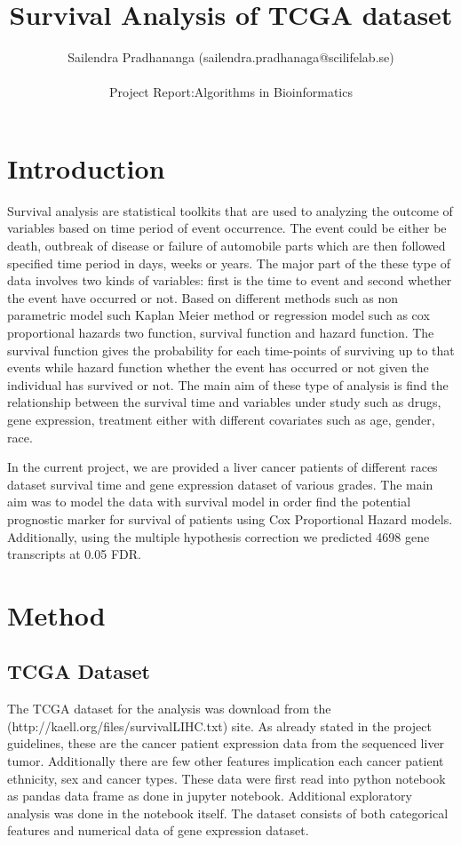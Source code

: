 \documentclass[a4paper,10pt]{article}
\title{Survival Analysis of TCGA dataset}
\author{ Sailendra Pradhananga (sailendra.pradhanaga@scilifelab.se)\\ \\
			Project Report:Algorithms in Bioinformatics}
\begin{document}
\maketitle

\section{Introduction}


Survival analysis are statistical toolkits that are used to analyzing the outcome of variables based on time period of event occurrence. The event could be either be death, outbreak of disease or failure of automobile parts which are then followed specified time period in days, weeks or years. The major part of the these type of data involves two kinds of variables: first is the time to event and second whether the event have occurred or not. Based on different methods such as non parametric model such Kaplan Meier method or regression model such as cox proportional hazards two function, survival function and hazard function. The survival function gives the probability  for each time-points of surviving up to that events while hazard function whether the event has occurred or not  given the individual has survived or not. The main aim of these type of analysis is find the relationship between the survival time and variables under study such as drugs, gene expression, treatment  either with different covariates such as age, gender, race.

In the current project, we are provided a liver cancer patients of different races  dataset survival time and gene expression dataset of various grades. The main aim was to model the data with survival model in order find the potential prognostic marker for survival of patients using Cox Proportional Hazard models. Additionally, using the multiple hypothesis correction we predicted 4698 gene transcripts at 0.05 FDR. 

\section{Method}

	\subsection{TCGA Dataset}
The  TCGA dataset for the analysis was download from the (http://kaell.org/files/survivalLIHC.txt) site. As already stated in the project guidelines, these are the cancer patient expression data from the sequenced liver tumor.  Additionally there are few other features implication each cancer patient ethnicity, sex and cancer types.  These data were first read into python notebook as pandas data frame  as done in  jupyter notebook.  Additional exploratory analysis was done in the notebook itself. The  dataset consists of both categorical features and numerical data of gene expression dataset. 
\end{document}
